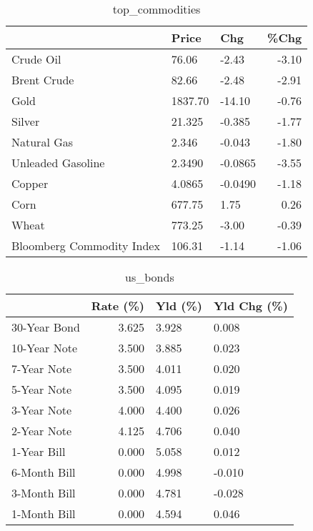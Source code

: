 \documentclass{article}%
\begin{document}
\begin{table}[htbp]%
\caption{top\_commodities}%
\centering%
\begin{adjustbox}{width=1\textwidth}%
\begin{tabular}{lllr}
\toprule
                          &   Price &     Chg &  \%Chg \\
\midrule
               Crude Oil  &   76.06 &   -2.43 & -3.10 \\
             Brent Crude  &   82.66 &   -2.48 & -2.91 \\
                    Gold  & 1837.70 &  -14.10 & -0.76 \\
                  Silver  &  21.325 &  -0.385 & -1.77 \\
             Natural Gas  &   2.346 &  -0.043 & -1.80 \\
       Unleaded Gasoline  &  2.3490 & -0.0865 & -3.55 \\
                  Copper  &  4.0865 & -0.0490 & -1.18 \\
                    Corn  &  677.75 &    1.75 &  0.26 \\
                   Wheat  &  773.25 &   -3.00 & -0.39 \\
Bloomberg Commodity Index &  106.31 &   -1.14 & -1.06 \\
\bottomrule
\end{tabular}
%
\end{adjustbox}%
\end{table}

%


\begin{table}[htbp]%
\caption{us\_bonds}%
\centering%
\begin{adjustbox}{width=1\textwidth}%
\begin{tabular}{lrll}
\toprule
             &  Rate (\%) & Yld (\%) & Yld Chg (\%) \\
\midrule
30-Year Bond &     3.625 &   3.928 &       0.008 \\
10-Year Note &     3.500 &   3.885 &       0.023 \\
 7-Year Note &     3.500 &   4.011 &       0.020 \\
 5-Year Note &     3.500 &   4.095 &       0.019 \\
 3-Year Note &     4.000 &   4.400 &       0.026 \\
 2-Year Note &     4.125 &   4.706 &       0.040 \\
 1-Year Bill &     0.000 &   5.058 &       0.012 \\
6-Month Bill &     0.000 &   4.998 &      -0.010 \\
3-Month Bill &     0.000 &   4.781 &      -0.028 \\
1-Month Bill &     0.000 &   4.594 &       0.046 \\
\bottomrule
\end{tabular}
%
\end{adjustbox}%
\end{table}
\end{document}
